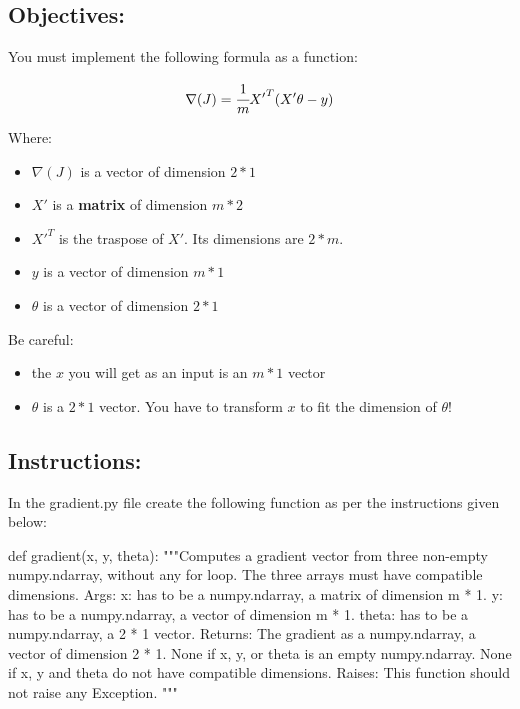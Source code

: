 \documentclass[]{article}
\newenvironment{Shaded}{\begin{snugshade}}{\end{snugshade}}
\newcommand{\CommentTok}[1]{\textcolor[rgb]{0.48,0.49,0.49}{#1}}
\newcommand{\KeywordTok}[1]{\textcolor[rgb]{0.81,0.81,0.76}{#1}}
\newcommand{\NormalTok}[1]{\textcolor[rgb]{0.81,0.81,0.76}{#1}}
\begin{document}
\hypertarget{objectives-3}{%
\subsection{Objectives:}\label{objectives-3}}

You must implement the following formula as a function:

\large

\[
\nabla(J) = \cfrac{1}{m} {X'}^T(X'\theta - y)
\] \normalsize

Where:

\begin{itemize}
\item
  \(\nabla(J)\) is a vector of dimension \(2 * 1\)
\item
  \(X'\) is a \textbf{matrix} of dimension \(m * 2\)
\item
  \({X'}^T\) is the traspose of \(X'\). Its dimensions are \(2 * m\).
\item
  \(y\) is a vector of dimension \(m * 1\)
\item
  \(\theta\) is a vector of dimension \(2 * 1\)
\end{itemize}

Be careful:

\begin{itemize}
\item
  the \(x\) you will get as an input is an \(m * 1\) vector
\item
  \(\theta\) is a \(2 * 1\) vector. You have to transform \(x\) to fit
  the dimension of \(\theta\)!
\end{itemize}

\hypertarget{instructions-3}{%
\subsection{Instructions:}\label{instructions-3}}

In the gradient.py file create the following function as per the
instructions given below:

\begin{Shaded}
\begin{Highlighting}[]
\KeywordTok{def}\NormalTok{ gradient(x, y, theta):}
    \CommentTok{"""Computes a gradient vector from three non-empty numpy.ndarray, without any for loop. The three arrays must have compatible dimensions.}
\CommentTok{    Args:}
\CommentTok{      x: has to be a numpy.ndarray, a matrix of dimension m * 1.}
\CommentTok{      y: has to be a numpy.ndarray, a vector of dimension m * 1.}
\CommentTok{      theta: has to be a numpy.ndarray, a 2 * 1 vector.}
\CommentTok{    Returns:}
\CommentTok{      The gradient as a numpy.ndarray, a vector of dimension 2 * 1.}
\CommentTok{      None if x, y, or theta is an empty numpy.ndarray.}
\CommentTok{      None if x, y and theta do not have compatible dimensions.}
\CommentTok{    Raises:}
\CommentTok{      This function should not raise any Exception.}
\CommentTok{    """}
\end{Highlighting}
\end{Shaded}
\end{document}
